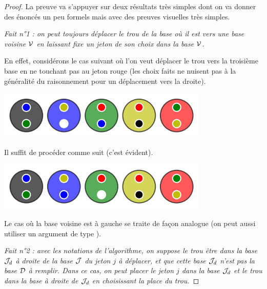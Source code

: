 \begin{proof}
    La preuve va s'appuyer sur deux résultats très simples dont on va donner des énoncés un peu formels mais avec des preuves visuelles très simples.


    \medskip

    \textit{Fait n°1 : on peut toujours déplacer le trou de la base où il est vers une base voisine $\cal V$ en laissant fixe un jeton de son choix dans la base $\cal V$.}


    \medskip

    En effet, considérons le cas suivant où l'on veut déplacer le trou vers la troisième base en ne touchant pas au jeton rouge (les choix faits ne nuisent pas à la généralité du raisonnement pour un déplacement vers la droite).

    \vspace{-0.4em}
    \begin{center}   %
        \includegraphics[scale= 0.45]{content/algo_selection/fact_1/000.png}
    \end{center}
    \vspace{-0.8em}

    Il suffit de procéder comme suit (c'est évident).

    \vspace{-0.4em}
    \begin{center}   %
        \includegraphics[scale= 0.45]{content/algo_selection/fact_1/001.png}
    \end{center}
    \vspace{-0.8em}

    Le cas où la base voisine est à gauche se traite de façon analogue (on peut aussi utiliser un argument de type ).


    \medskip

    \textit{Fait n°2 : avec les notations de l'algorithme, on suppose le trou être dans la base ${\cal J}_d$ à droite de la base $\cal J$ du jeton $j$ à déplacer, et que cette base ${\cal J}_d$ n'est pas la base $\cal D$ à remplir. Dans ce cas, on peut placer le jeton $j$ dans la base ${\cal J}_d$ et le trou dans la base à droite de ${\cal J}_d$ en choisissant la place du trou.}



\end{proof}
